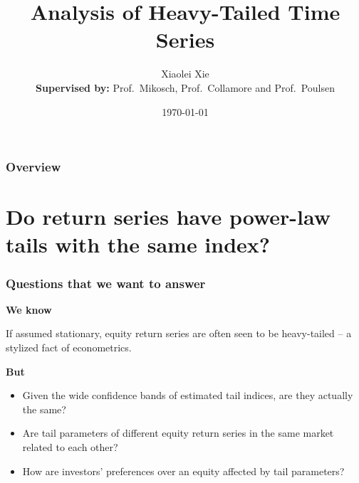 \documentclass{beamer}
\title{Analysis of Heavy-Tailed Time Series}
\author{
  Xiaolei Xie\\
  \medskip
  {\scriptsize {\bf Supervised by:}  Prof.~Mikosch, Prof.~Collamore and Prof.~Poulsen}
} %
\institute[UCPH] %
{
University of Copenhagen \\ %
\medskip
\textit{xie@math.ku.dk} %
}
\date{\today} %
\begin{document}
\begin{frame}
\titlepage %
\end{frame}



\begin{frame}
\frametitle{Overview}
\tableofcontents
\end{frame}

\section{Do return series have power-law tails with the same index?}
\begin{frame}
  \frametitle{Questions that we want to answer}
  \textcolor[HTML]{990033}{\bf We know}

  If assumed stationary, equity return series are often seen to be
  heavy-tailed -- a stylized fact of econometrics.
  
  \textcolor[HTML]{990033}{\bf But}
  \begin{itemize}
    \item Given the wide confidence bands of estimated tail indices,
      are they actually the same?
    \item Are tail parameters of different equity return series in the same
      market related to each other?
    \item How are investors' preferences over an equity affected by
      tail parameters?
  \end{itemize}
\end{frame}
\end{document}
